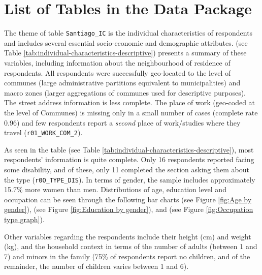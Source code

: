 \documentclass[
11pt, %
oneside, %
english, %
singlespacing, %
]{macthesis} %
\begin{document}
\hypertarget{list-of-tables-in-the-data-package}{%
\section{List of Tables in the Data Package}\label{list-of-tables-in-the-data-package}}

The theme of table \texttt{Santiago\_IC} is the individual characteristics of respondents and includes several essential socio-economic and demographic attributes. (see Table \ref{tab:individual-characteristics-descriptive}) presents a summary of these variables, including information about the neighbourhood of residence of respondents. All respondents were successfully geo-located to the level of communes (large administrative partitions equivalent to municipalities) and macro zones (larger aggregations of communes used for descriptive purposes). The street address information is less complete. The place of work (geo-coded at the level of Communes) is missing only in a small number of cases (complete rate 0.96) and few respondents report a \emph{second} place of work/studies where they travel (\texttt{r01\_WORK\_COM\_2}).

As seen in the table (see Table \ref{tab:individual-characteristics-descriptive}), most respondents' information is quite complete. Only 16 respondents reported facing some disability, and of these, only 11 completed the section asking them about the type (\texttt{r0O\_TYPE\_DIS}). In terms of gender, the sample includes approximately 15.7\% more women than men. Distributions of age, education level and occupation can be seen through the following bar charts (see Figure \ref{fig:Age by gender}), (see Figure \ref{fig:Education by gender}), and (see Figure \ref{fig:Occupation type graph}).

Other variables regarding the respondents include their height (cm) and weight (kg), and the household context in terms of the number of adults (between 1 and 7) and minors in the family (75\% of respondents report no children, and of the remainder, the number of children varies between 1 and 6).
\end{document}
